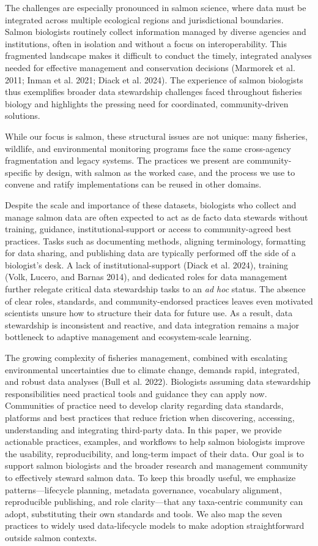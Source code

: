 \documentclass[
  letterpaper,
  DIV=11,
  numbers=noendperiod]{scrartcl}
\begin{document}
The challenges are especially pronounced in salmon science, where data
must be integrated across multiple ecological regions and jurisdictional
boundaries. Salmon biologists routinely collect information managed by
diverse agencies and institutions, often in isolation and without a
focus on interoperability. This fragmented landscape makes it difficult
to conduct the timely, integrated analyses needed for effective
management and conservation decisions (Marmorek et al. 2011; Inman et
al. 2021; Diack et al. 2024). The experience of salmon biologists thus
exemplifies broader data stewardship challenges faced throughout
fisheries biology and highlights the pressing need for coordinated,
community-driven solutions.

While our focus is salmon, these structural issues are not unique: many
fisheries, wildlife, and environmental monitoring programs face the same
cross-agency fragmentation and legacy systems. The practices we present
are community-specific by design, with salmon as the worked case, and
the process we use to convene and ratify implementations can be reused
in other domains.

Despite the scale and importance of these datasets, biologists who
collect and manage salmon data are often expected to act as de facto
data stewards without training, guidance, institutional-support or
access to community-agreed best practices. Tasks such as documenting
methods, aligning terminology, formatting for data sharing, and
publishing data are typically performed off the side of a biologist's
desk. A lack of institutional-support (Diack et al. 2024), training
(Volk, Lucero, and Barnas 2014), and dedicated roles for data management
further relegate critical data stewardship tasks to an \emph{ad hoc}
status. The absence of clear roles, standards, and community-endorsed
practices leaves even motivated scientists unsure how to structure their
data for future use. As a result, data stewardship is inconsistent and
reactive, and data integration remains a major bottleneck to adaptive
management and ecosystem-scale learning.

The growing complexity of fisheries management, combined with escalating
environmental uncertainties due to climate change, demands rapid,
integrated, and robust data analyses (Bull et al. 2022). Biologists
assuming data stewardship responsibilities need practical tools and
guidance they can apply now. Communities of practice need to develop
clarity regarding data standards, platforms and best practices that
reduce friction when discovering, accessing, understanding and
integrating third-party data. In this paper, we provide actionable
practices, examples, and workflows to help salmon biologists improve the
usability, reproducibility, and long-term impact of their data. Our goal
is to support salmon biologists and the broader research and management
community to effectively steward salmon data. To keep this broadly
useful, we emphasize patterns---lifecycle planning, metadata governance,
vocabulary alignment, reproducible publishing, and role clarity---that
any taxa-centric community can adopt, substituting their own standards
and tools. We also map the seven practices to widely used data-lifecycle
models to make adoption straightforward outside salmon contexts.
\end{document}
